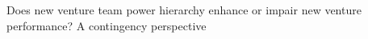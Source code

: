 \documentclass[11pt]{article}
\begin{document}







Does new venture team power hierarchy enhance or impair new venture performance? A contingency perspective



\end{document}
